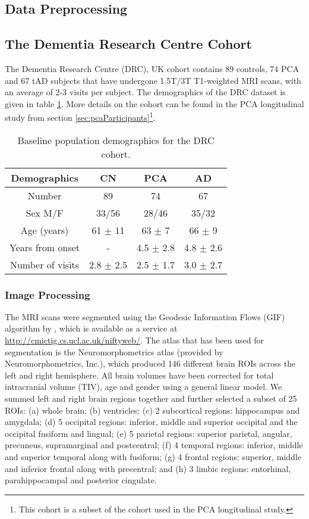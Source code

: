 \subsection{Data Preprocessing}

\subsection{The Dementia Research Centre Cohort}
\label{sec:dataPrep}

The Dementia Research Centre (DRC), UK cohort contains 89 controls, 74 PCA and 67 tAD subjects that have undergone 1.5T/3T T1-weighted MRI scans,  with an average of 2-3 visits per subject. The demographics of the DRC dataset is given in table \ref{tab:drcDemographics}. More details on the cohort can be found in the PCA longitudinal study from section \ref{sec:pcaParticipants}\footnote{This cohort is a subset of the cohort used in the PCA longitudinal study.}.

\begin{table}[ht]
\centering
 \begin{tabular}{c | c c c}
  Demographics & CN & PCA & AD\\
  \hline
  Number & 89 & 74 & 67\\
  Sex M/F & 33/56 & 28/46 & 35/32 \\
  Age (years) & 61 $\pm$ 11 & 63 $\pm$ 7 & 66 $\pm$ 9\\
  Years from onset & - & 4.5 $\pm$ 2.8 & 4.8 $\pm$ 2.6\\
  Number of visits & 2.8 $\pm$ 2.5 & 2.5 $\pm$ 1.7 & 3.0 $\pm$ 2.7\\
 \end{tabular}
 \caption[Baseline population demographics for DRC data]{Baseline population demographics for the DRC cohort.}
 \label{tab:drcDemographics}
\end{table}

\subsubsection{Image Processing}
The MRI scans were segmented using the Geodesic Information Flows (GIF) algorithm by \cite{cardoso2015geodesic}, which is available as a service at \url{http://cmictig.cs.ucl.ac.uk/niftyweb/}. The atlas that has been used for segmentation is the Neuromorphometrics atlas (provided by Neuromorphometrics, Inc.), which produced 146 different brain ROIs across the left and right hemisphere. All brain volumes have been corrected for total intracranial volume (TIV), age and gender using a general linear model. We summed left and right brain regions together and further selected a subset of 25 ROIs: (a) whole brain; (b) ventricles; (c) 2 subcortical regions: hippocampus and amygdala; (d) 5 occipital regions: inferior, middle and superior occipital and the occipital fusiform and lingual; (e) 5 parietal regions: superior parietal, angular, precuneus, supramarginal and postcentral; (f) 4 temporal regions: inferior, middle and superior temporal along with fusiform; (g) 4 frontal regions: superior, middle and inferior frontal along with precentral; and (h) 3 limbic regions: entorhinal, parahippocampal and posterior cingulate.

